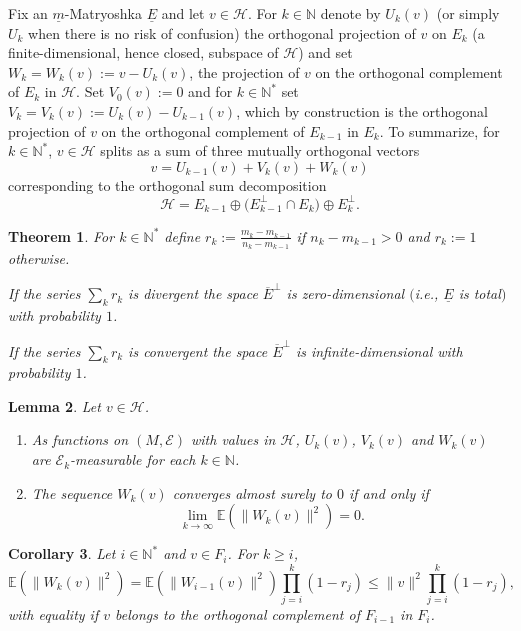 \documentclass[10pt,a4paper]{article}
\newcommand{\hilH}{\mathcal H}
\newcommand{\norm}[1]{\lVert #1\rVert}
\newcommand{\kN}{k\in \mathbb{N}}
\newcommand{\iN}{i\in \mathbb{N}}
\newcommand{\expec}[1]{\mathbb{E}\left(#1\right)}
\newcommand{\algE}{{\mathcal E}}
\newtheorem{Theorem}{Theorem}[section]
\newtheorem{Corollary}[Theorem]{Corollary}
\newtheorem{Lemma}[Theorem]{Lemma}
\begin{document}
Fix an $\underline{m}$-Matryoshka $\underline{E}$ and let $v\in \hilH$. For $\kN$ denote by $U_k(v)$ (or simply $U_k$ when there is no risk of confusion) the orthogonal projection of $v$ on $E_k$ (a finite-dimensional, hence closed, subspace of $\hilH$) and set $W_k=W_k(v):=v-U_k(v)$, the projection of $v$ on the orthogonal complement of $E_k$ in $\hilH$. Set $V_0(v):=0$ and for $\kN^*$ set $V_k=V_k(v):=U_k(v)-U_{k-1}(v)$, which by construction is the orthogonal projection of $v$ on the orthogonal complement of $E_{k-1}$ in $E_k$. To summarize, for $\kN^*$, $v\in \hilH$ splits as a sum of three mutually orthogonal vectors
\[
v=U_{k-1}(v)+V_k(v)+W_k(v)
\]
corresponding to the orthogonal sum decomposition
\[
 \hilH = E_{k-1} \oplus \big(E_{k-1}^\perp  \cap  E_k\big) \oplus E_k^\perp.
 \]

\begin{Theorem} \label{theo:maindense}
For $\kN^*$ define $r_k:=\frac{m_k-m_{k-1}}{n_{k}-m_{k-1}}$ if $n_{k}-m_{k-1}>0$ and $r_k:=1$ otherwise.

 If the series $\sum_k r_k$ is divergent the space $\overline{E}^\perp$ is zero-dimensional $($i.e., $\underline{E}$ is total$)$ with pro\-ba\-bility $1$.

 If the series $\sum_k r_k$ is convergent the space $\overline{E}^\perp$ is infinite-dimensional with probability $1$.
\end{Theorem}

\begin{Lemma} \label{lem:basicfacts1} Let $v\in \hilH$.
\begin{enumerate}\itemsep=0pt
\item[$(i)$] As functions on $(M,\algE)$ with values in $\hilH$, $U_k(v)$, $V_k(v)$ and $W_k(v)$ are $\algE_k$-measurable for each $\kN$.

\item[$(ii)$] The sequence $W_k(v)$ converges almost surely to $0$ if and only if
\[
\lim_{k\to \infty} \expec{\norm{W_k(v)}^2}=0.
\]
\end{enumerate}
\end{Lemma}

\begin{Corollary} \label{cor:prodineq} Let $\iN^*$ and $v\in F_i$.
For $k \geq i$,
\[
\expec{\norm{W_k(v)}^2}=\expec{\norm{W_{i-1}(v)}^2}\prod_{j=i}^{k} (1-r_j) \leq \norm{v}^2\prod_{j=i}^{k} (1-r_j),
\]
with equality if $v$ belongs to the orthogonal complement of $F_{i-1}$ in $F_i$.
\end{Corollary}
\end{document}
